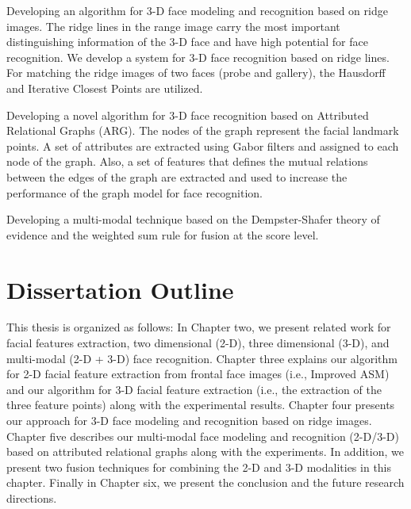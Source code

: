 \item
Developing an algorithm for 3-D face modeling and recognition based
on ridge images. The ridge lines in the range image carry the most
important distinguishing information of the 3-D face and have high
potential for face recognition. We develop a system for 3-D face
recognition based on ridge lines. For matching the ridge images of
two faces (probe and gallery), the Hausdorff and Iterative Closest
Points are utilized.

\item
Developing a novel algorithm for 3-D face recognition based on
Attributed Relational Graphs (ARG). The nodes of the graph represent
the facial landmark points. A set of attributes are extracted using
Gabor filters and assigned to each node of the graph. Also, a set of
features that defines the mutual relations between the edges of the
graph are extracted and used to increase the performance of the
graph model for face recognition.

\item Developing a multi-modal technique based on the Dempster-Shafer theory
of evidence and the weighted sum rule for fusion at the score level.
\ei

\section{Dissertation Outline}
This thesis is organized as follows: In Chapter two, we present
related work for facial features extraction, two dimensional (2-D),
three dimensional (3-D), and multi-modal (2-D + 3-D) face
recognition. Chapter three explains our algorithm for 2-D facial
feature extraction from frontal face images (i.e., Improved ASM) and
our algorithm for 3-D facial feature extraction (i.e., the
extraction of the three feature points) along with the experimental
results. Chapter four presents our approach for 3-D face modeling
and recognition based on ridge images. Chapter five describes our
multi-modal face modeling and recognition (2-D/3-D) based on
attributed relational graphs along with the experiments. In
addition, we present two fusion techniques for combining the 2-D and
3-D modalities in this chapter. Finally in Chapter six, we present
the conclusion and the future research directions.
